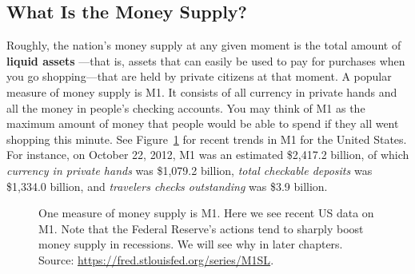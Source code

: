 \documentclass[
  letterpaper,
]{book}
\theoremstyle{plain}
\theoremstyle{remark}
\begin{document}
\subsection{What Is the Money Supply?}\label{sec-msupply}

Roughly, the nation's money supply at any given
moment is the total amount of \textbf{liquid assets}
---that is, assets that can easily be used to pay
for purchases when you go shopping---that are held by private citizens
at that moment. A popular measure of money supply is M1. It consists of
all currency in private hands and all the money in people's checking
accounts. You may think of M1 as the maximum amount of money that people
would be able to spend if they all went shopping this minute. See
Figure~\ref{fig-M1-post2000-fredgraph} for recent trends in M1 for the
United States. For instance, on October 22, 2012, M1 was an estimated
\$2,417.2 billion, of which \emph{currency in private hands} was
\$1,079.2 billion, \emph{total checkable deposits} was \$1,334.0
billion, and \emph{travelers checks outstanding} was \$3.9 billion.

\begin{figure}


\caption{\label{fig-M1-post2000-fredgraph}One measure of money supply is
M1. Here we see recent US data on M1. Note that the Federal Reserve's
actions tend to sharply boost money supply in recessions. We will see
why in later chapters. Source:
\url{https://fred.stlouisfed.org/series/M1SL}.}

\end{figure}%
\end{document}

